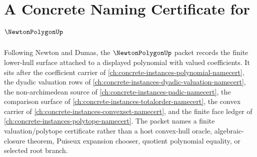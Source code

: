 \chapter{A Concrete Naming Certificate for $\NewtonPolygonUp$}
\label{ch:concrete-instances-newton-polygon-namecert}

Following Newton and Dumas, the $\NewtonPolygonUp$ packet records the finite lower-hull surface attached to a displayed polynomial with valued coefficients. It sits after the coefficient carrier of \autoref{ch:concrete-instances-polynomial-namecert}, the dyadic valuation rows of \autoref{ch:concrete-instances-dyadic-valuation-namecert}, the non-archimedean source of \autoref{ch:concrete-instances-padic-namecert}, the comparison surface of \autoref{ch:concrete-instances-totalorder-namecert}, the convex carrier of \autoref{ch:concrete-instances-convexset-namecert}, and the finite face ledger of \autoref{ch:concrete-instances-polytope-namecert}. The packet names a finite valuation/polytope certificate rather than a host convex-hull oracle, algebraic-closure theorem, Puiseux expansion chooser, quotient polynomial equality, or selected root branch.


